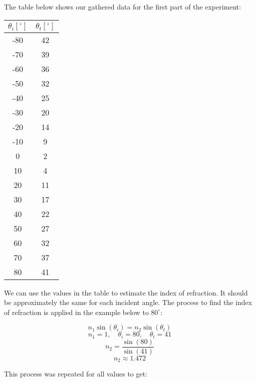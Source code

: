 \documentclass[
	letterpaper, %
	10pt, %
]{CSUniSchoolLabReport}
\begin{document}
The table below shows our gathered data for the first part of the experiment:

\begin{center}
\begin{tabular}[H]{|c|c|}
  \hline
  $\theta_i [^{\circ}]$ & $\theta_t [^{\circ}]$\\
  \hline
  -80 & 42\\ \hline
  -70 & 39\\
  \hline
  -60 & 36\\
  \hline
  -50 & 32\\
  \hline
  -40 & 25\\
  \hline
  -30 & 20\\
  \hline
  -20 & 14\\
  \hline
  -10 & 9\\
  \hline
  0 & 2\\
  \hline
  10 & 4\\
  \hline
  20 & 11\\
  \hline
  30 & 17\\
  \hline
  40 & 22\\
  \hline
  50 & 27\\
  \hline
  60 & 32\\
  \hline
  70 & 37\\
  \hline
  80 & 41\\
  \hline
\end{tabular}
\end{center}

We can use the values in the table to estimate the index of refraction. It should be approximately the same for each incident angle. The process to find the index of refraction is applied in the example below to $80^{\circ}$:

$$n_1\sin(\theta_i)=n_2\sin(\theta_t)$$
$$n_1=1,\quad\theta_i=80,\quad\theta_t=41$$
$$n_2=\frac{\sin(80)}{\sin(41)}$$
$$n_2\approx1.472$$

This process was repeated for all values to get:
\end{document}
